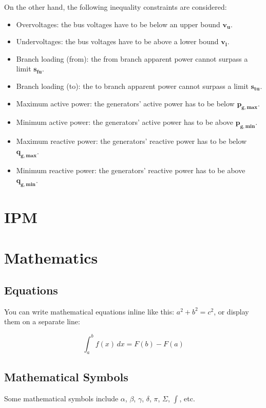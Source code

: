 \documentclass{article}
\begin{document}
On the other hand, the following inequality constraints are considered:
\begin{itemize}
    \item Overvoltages: the bus voltages have to be below an upper bound $\bm{v_u}$.
    \item Undervoltages: the bus voltages have to be above a lower bound $\bm{v_l}$.
    \item Branch loading (from): the from branch apparent power cannot surpass a limit $\bm{s_{fu}}$. 
    \item Branch loading (to): the to branch apparent power cannot surpass a limit $\bm{s_{tu}}$. 
    \item Maximum active power: the generators' active power has to be below $\bm{p_{g,\text{max}}}$.
    \item Minimum active power: the generators' active power has to be above $\bm{p_{g,\text{min}}}$.
    \item Maximum reactive power: the generators' reactive power has to be below $\bm{q_{g,\text{max}}}$.
    \item Minimum reactive power: the generators' reactive power has to be above $\bm{q_{g,\text{min}}}$.
\end{itemize}

\section{IPM}

\section{Mathematics}

\subsection{Equations}

You can write mathematical equations inline like this: $a^2 + b^2 = c^2$, or display them on a separate line:

\begin{equation}
  \int_{a}^{b} f(x) \,dx = F(b) - F(a)
\end{equation}

\subsection{Mathematical Symbols}

Some mathematical symbols include $\alpha$, $\beta$, $\gamma$, $\delta$, $\pi$, $\Sigma$, $\int$, etc.
\end{document}
